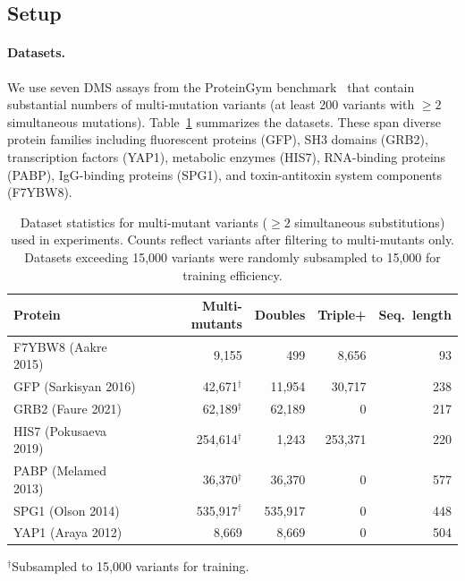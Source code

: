 \documentclass{article}
\begin{document}
\subsection{Setup}

\paragraph{Datasets.}
We use seven DMS assays from the ProteinGym benchmark~\citep{notin2023proteingym} that contain substantial numbers of multi-mutation variants (at least 200 variants with $\geq 2$ simultaneous mutations).
Table~\ref{tab:datasets} summarizes the datasets.
These span diverse protein families including fluorescent proteins (GFP), SH3 domains (GRB2), transcription factors (YAP1), metabolic enzymes (HIS7), RNA-binding proteins (PABP), IgG-binding proteins (SPG1), and toxin-antitoxin system components (F7YBW8).

\begin{table}[t]
\centering
\caption{Dataset statistics for multi-mutant variants ($\geq 2$ simultaneous substitutions) used in experiments. Counts reflect variants after filtering to multi-mutants only. Datasets exceeding 15{,}000 variants were randomly subsampled to 15{,}000 for training efficiency.}
\label{tab:datasets}
\begin{tabular}{lrrrr}
\toprule
Protein & Multi-mutants & Doubles & Triple+ & Seq.\ length \\
\midrule
F7YBW8 (Aakre 2015) & 9{,}155 & 499 & 8{,}656 & 93 \\
GFP (Sarkisyan 2016) & 42{,}671$^\dagger$ & 11{,}954 & 30{,}717 & 238 \\
GRB2 (Faure 2021) & 62{,}189$^\dagger$ & 62{,}189 & 0 & 217 \\
HIS7 (Pokusaeva 2019) & 254{,}614$^\dagger$ & 1{,}243 & 253{,}371 & 220 \\
PABP (Melamed 2013) & 36{,}370$^\dagger$ & 36{,}370 & 0 & 577 \\
SPG1 (Olson 2014) & 535{,}917$^\dagger$ & 535{,}917 & 0 & 448 \\
YAP1 (Araya 2012) & 8{,}669 & 8{,}669 & 0 & 504 \\
\bottomrule
\end{tabular}
\vspace{1mm}
\small{$^\dagger$Subsampled to 15{,}000 variants for training.}
\end{table}
\end{document}
